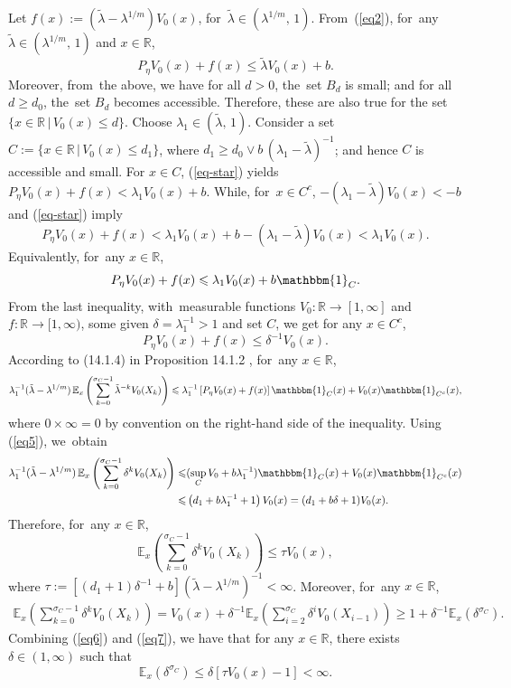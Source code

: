 \documentclass[11pt]{elsarticle}
\def\geq{\geqslant}
\def\leq{\leqslant}
\def\E{\mathbb{E}}
\def\R{\mathbb{R}}
\begin{document}
\begin{pf}
	Let $f(x):=(\tilde{\lambda}-\lambda^{1/m})V_0(x)$, for~$\tilde{\lambda}\in(\lambda^{1/m},\,1)$. From~(\ref{eq2}), for~any $\tilde{\lambda}\in(\lambda^{1/m},\,1)$ and $x\in \R$,
	\begin{equation}\label{eq-star}
		P_\eta V_0(x)+f(x)\leq\tilde{\lambda}V_0(x)+b.
	\end{equation} 
	Moreover, from~the above, we have for all $d>0$, the~set $B_d$ is small; and for all $d\geq d_0$, the~set $B_d$ becomes accessible. Therefore, these are also true for the set $\{x\in\R\,|\,V_0(x)\leq d\}$. Choose $\lambda_1\in(\tilde{\lambda},\, 1)$. Consider a set $C:=\{x\in\R\,|\,V_0(x)\leq d_1\}$, where $d_1\geq d_0\vee b\,(\lambda_1-\tilde{\lambda})^{-1}$; and hence $C$ is accessible and small.
	For $x\in C$, (\ref{eq-star}) yields $P_\eta V_0(x)+f(x)< \lambda_1V_0(x)+b$. While, for~$x\in C^c$, $-(\lambda_1-\tilde{\lambda})V_0(x)<-b$ and (\ref{eq-star}) imply
	\vspace{-4pt}
	$$P_\eta V_0(x)+f(x)<\lambda_1V_0(x)+b-(\lambda_1-\tilde{\lambda})V_0(x)<\lambda_1V_0(x).$$
	Equivalently, for~any $x\in\R$,
	\begin{equation}\label{eq5}
		P_\eta V_0(x)+f(x)\leq\lambda_1V_0(x)+b\mathbbm{1}_C.
	\end{equation}
	From the last inequality, with~measurable functions $V_0:\R\rightarrow[1,\infty]$ and $f: \R\rightarrow[1,\infty)$, some given $\delta=\lambda_1^{-1}>1$ and set $C$, we get for any $x\in C^c$,
	$$P_\eta V_0(x)+f(x)\leq\delta^{-1}V_0(x).$$
	According to ({14.1.4}) in {Proposition 14.1.2} \cite{DMPS18}, for~any $x\in\R$,
	$$\lambda_1^{-1}(\tilde{\lambda}-\lambda^{1/m})\,\E_x\left(\sum_{k=0}^{\sigma_C-1}\tilde{\lambda}^{-k}V_0(X_k)\right)\leq\lambda_1^{-1}\left[P_\eta V_0(x)+f(x)\right]\mathbbm{1}_C(x)+V_0(x)\mathbbm{1}_{C^c}(x),$$
	where $0\times\infty=0$ by convention on the right-hand side of the inequality. Using (\ref{eq5}), we~obtain
	\begin{align*}
		\lambda_1^{-1}(\tilde{\lambda}-\lambda^{1/m})\,\E_x\left(\sum_{k=0}^{\sigma_C-1}\delta^kV_0(X_k)\right)\leq&(\sup_CV_0+b\lambda_1^{-1})\mathbbm{1}_C(x)+V_0(x)\mathbbm{1}_{C^c}(x)\\
		\leq&\left(d_1+b\lambda_1^{-1}+1\right)V_0(x)=(d_1+b\delta+1)V_0(x).
	\end{align*}
	Therefore, for~any $x\in \R$,
	\begin{equation}\label{eq6}
		\E_x\left(\sum_{k=0}^{\sigma_C-1}\delta^kV_0(X_k)\right)\leq\tau V_0(x),
	\end{equation}
	where $\tau:=[(d_1+1)\delta^{-1}+b](\tilde{\lambda}-\lambda^{1/m})^{-1}<\infty$. Moreover, for~any $x\in \R$,
	\begin{align}\label{eq7}
		\E_x\left(\sum_{k=0}^{\sigma_C-1}\delta^kV_0(X_k)\right)=V_0(x)+\delta^{-1}\E_x\left(\sum_{i=2}^{\sigma_C}\delta^iV_0(X_{i-1})\right)\geq1+\delta^{-1}\E_x\left(\delta^{\sigma_C}\right).
	\end{align}
	Combining (\ref{eq6}) and (\ref{eq7}), we have that for any $x\in \R$, there exists $\delta\in(1,\infty)$ such that
	$$\E_x\left(\delta^{\sigma_C}\right)\leq\delta\left[\tau V_0(x)-1\right]<\infty.$$
	

\end{pf}
\end{document}
